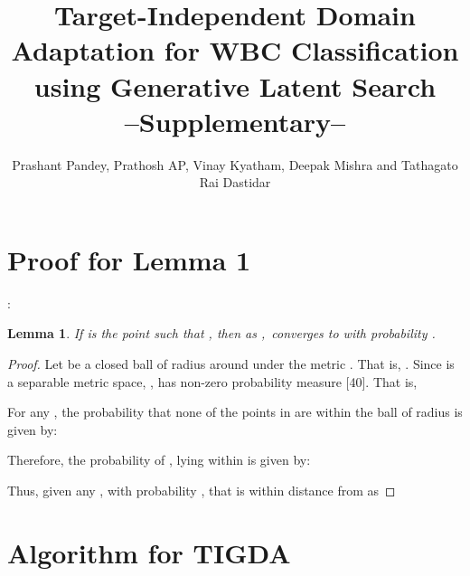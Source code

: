 \documentclass[journal,twoside,web]{IEEEtran}
\newtheorem{lemma}{Lemma}
\begin{document}














\clearpage


\title{Target-Independent Domain Adaptation for WBC Classification using Generative Latent Search \\--Supplementary--}
 \author{
Prashant Pandey, Prathosh AP, Vinay Kyatham, Deepak Mishra and 
Tathagato Rai Dastidar
}
\maketitle
\setlength{\dbltextfloatsep}{0.2cm}
\section{Proof for Lemma 1}:
\begin{lemma}

If  is the point such that , then as ,\   converges to   with probability . 
\end{lemma}

\begin{proof}
Let   be a closed ball of radius  around  under the metric . That is,  . Since  is a separable metric space, ,  has non-zero probability measure [40]. That is, 

For any  , the probability that  none of the points in  are within the ball  of radius  is given by:
\setlength{\textfloatsep}{1pt}

Therefore, the probability of , lying within  is given by: 
\setlength{\textfloatsep}{1pt}

Thus, given any , with probability ,  that is within   distance from  as 
\end{proof}

\vspace{2.9 in}
\section{Algorithm for TIGDA}
\end{document}
